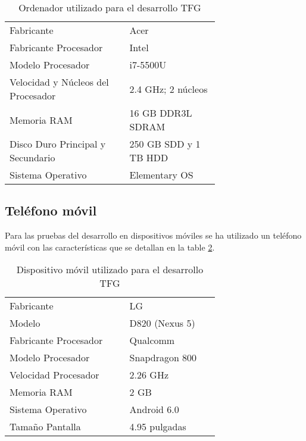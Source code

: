 	\begin{table}[H]
	  \centering 
	  \begin{tabular}{p{0.4\linewidth}p{0.3\linewidth}}
	    \toprule
	    Fabricante 							& Acer 											\\
		Fabricante Procesador 				& Intel 										\\
		Modelo Procesador 					& i7-5500U 										\\
		Velocidad y Núcleos del Procesador & 2.4 GHz; 2 núcleos 							\\
		Memoria RAM 						& 16 \ac{GB} \ac{DDR}3L \ac{SDRAM} 			\\
		Disco Duro Principal y Secundario 	& 250 \ac{GB} \ac{SDD} y 1 \ac{TB} \ac{HDD}	\\
		Sistema Operativo					& Elementary \ac{OS} 							\\
	    \hline
	  \end{tabular}
	  \caption{Ordenador utilizado para el desarrollo \ac{TFG}}
	  \label{tab:portatil}
	\end{table}
	
	\subsection{Teléfono móvil}
	
	Para las pruebas del desarrollo en dispositivos móviles se ha utilizado un teléfono móvil con las características que se detallan en la table \ref{tab:movil}.
	
	\begin{table}[H]
	  \centering 
	  \begin{tabular}{p{0.4\linewidth}p{0.3\linewidth}}
	    \toprule
	    Fabricante 				& LG 				\\
	    Modelo 					& D820 (Nexus 5) 	\\
		Fabricante Procesador 	& Qualcomm 			\\
		Modelo Procesador 		& Snapdragon 800 	\\
		Velocidad Procesador 	& 2.26 GHz 			\\
		Memoria RAM 			& 2 \ac{GB} 		\\
		Sistema Operativo 		& Android 6.0 		\\
		Tamaño Pantalla			& 4.95 pulgadas 	\\
	    \hline
	  \end{tabular}
	  \caption{Dispositivo móvil utilizado para el desarrollo \ac{TFG}}
	  \label{tab:movil}
	\end{table}
	
